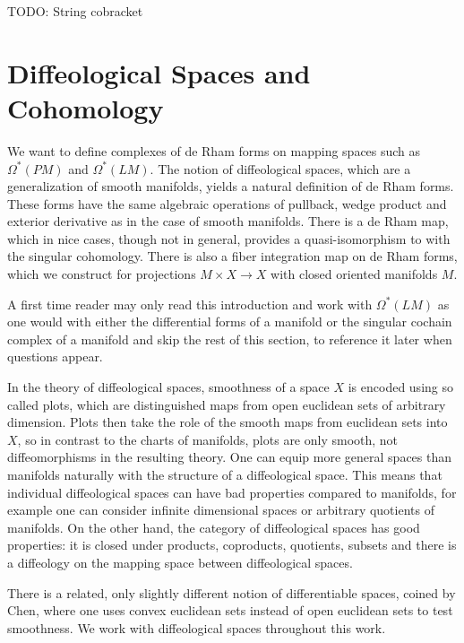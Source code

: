 \documentclass{scrartcl}
\theoremstyle{plain}
\theoremstyle{definition}
\begin{document}
TODO: String cobracket





\section{Diffeological Spaces and Cohomology}\label{sec:diffeological}

We want to define complexes of de Rham forms on mapping spaces such as $\Omega^*(PM)$ and $\Omega^*(LM)$. The notion of diffeological spaces, which are a generalization of smooth manifolds, yields a natural definition of de Rham forms. These forms have the same algebraic operations of pullback, wedge product and exterior derivative as in the case of smooth manifolds. There is a de Rham map, which in nice cases, though not in general, provides a quasi-isomorphism to with the singular cohomology. There is also a fiber integration map on de Rham forms, which we construct for projections $M\times X\to X$ with closed oriented manifolds $M$. 

A first time reader may only read this introduction and work with $\Omega^*(LM)$ as one would with either the differential forms of a manifold or the singular cochain complex of a manifold and skip the rest of this section, to reference it later when questions appear. 

In the theory of diffeological spaces, smoothness of a space $X$ is encoded using so called plots, which are distinguished maps from open euclidean sets of arbitrary dimension. Plots then take the role of the smooth maps from euclidean sets into $X$, so in contrast to the charts of manifolds, plots are only smooth, not diffeomorphisms in the resulting theory. One can equip more general spaces than manifolds naturally with the structure of a diffeological space. This means that individual diffeological spaces can have bad properties compared to manifolds, for example one can consider infinite dimensional spaces or arbitrary quotients of manifolds. On the other hand, the category of diffeological spaces has good properties: it is closed under products, coproducts, quotients, subsets and there is a diffeology on the mapping space between diffeological spaces. 

There is a related, only slightly different notion of differentiable spaces, coined by Chen, where one uses convex euclidean sets instead of open euclidean sets to test smoothness. We work with diffeological spaces throughout this work. 
\end{document}
